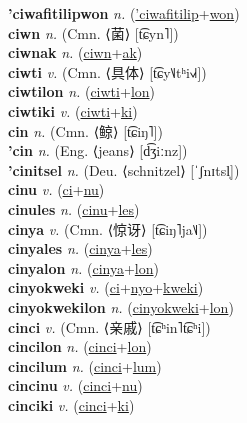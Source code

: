 \textbf{'ciwafitilipwon} \textit{n.} (\hyperref['ciwafitilip]{'ciwafitilip}+\hyperref[won]{won})
 \label{'ciwafitilipwon} \\
\textbf{ciwn} \textit{n.} (Cmn. ⟨菌⟩ [t͡ɕyn˥])
 \label{ciwn} \\
\textbf{ciwnak} \textit{n.} (\hyperref[ciwn]{ciwn}+\hyperref[ak]{ak})
 \label{ciwnak} \\
\textbf{ciwti} \textit{v.} (Cmn. ⟨具体⟩ [t͡ɕy˥˩tʰi˧˩˧])
 \label{ciwti} \\
\textbf{ciwtilon} \textit{n.} (\hyperref[ciwti]{ciwti}+\hyperref[lon]{lon})
 \label{ciwtilon} \\
\textbf{ciwtiki} \textit{v.} (\hyperref[ciwti]{ciwti}+\hyperref[ki]{ki})
 \label{ciwtiki} \\
\textbf{cin} \textit{n.} (Cmn. ⟨鲸⟩ [t͡ɕiŋ˥])
 \label{cin} \\
\textbf{'cin} \textit{n.} (Eng. ⟨jeans⟩ [d͡ʒiːnz])
 \label{'cin} \\
\textbf{'cinitsel} \textit{n.} (Deu. ⟨schnitzel⟩ [ˈʃnɪtsl̩])
 \label{'cinitsel} \\
\textbf{cinu} \textit{v.} (\hyperref[ci]{ci}+\hyperref[nu]{nu})
 \label{cinu} \\
\textbf{cinules} \textit{n.} (\hyperref[cinu]{cinu}+\hyperref[les]{les})
 \label{cinules} \\
\textbf{cinya} \textit{v.} (Cmn. ⟨惊讶⟩ [t͡ɕiŋ˥ja˥˩])
 \label{cinya} \\
\textbf{cinyales} \textit{n.} (\hyperref[cinya]{cinya}+\hyperref[les]{les})
 \label{cinyales} \\
\textbf{cinyalon} \textit{n.} (\hyperref[cinya]{cinya}+\hyperref[lon]{lon})
 \label{cinyalon} \\
\textbf{cinyokweki} \textit{v.} (\hyperref[ci]{ci}+\hyperref[nyo]{nyo}+\hyperref[kweki]{kweki})
 \label{cinyokweki} \\
\textbf{cinyokwekilon} \textit{n.} (\hyperref[cinyokweki]{cinyokweki}+\hyperref[lon]{lon})
 \label{cinyokwekilon} \\
\textbf{cinci} \textit{v.} (Cmn. ⟨亲戚⟩ [t͡ɕʰin˥t͡ɕʰi])
 \label{cinci} \\
\textbf{cincilon} \textit{n.} (\hyperref[cinci]{cinci}+\hyperref[lon]{lon})
 \label{cincilon} \\
\textbf{cincilum} \textit{n.} (\hyperref[cinci]{cinci}+\hyperref[lum]{lum})
 \label{cincilum} \\
\textbf{cincinu} \textit{v.} (\hyperref[cinci]{cinci}+\hyperref[nu]{nu})
 \label{cincinu} \\
\textbf{cinciki} \textit{v.} (\hyperref[cinci]{cinci}+\hyperref[ki]{ki})
